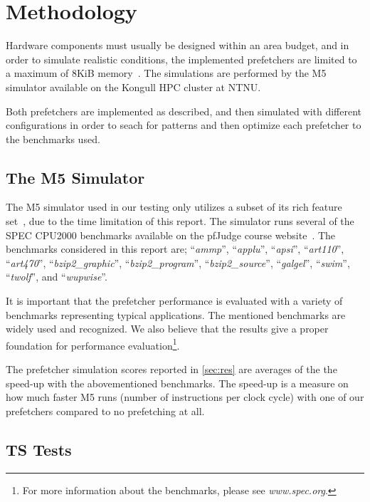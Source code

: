 \section{Methodology}

Hardware components must usually be designed within an area budget, and in order
to simulate realistic conditions, the implemented prefetchers are limited to a
maximum of 8KiB memory~\cite{guidelines}. The simulations are performed by the
M5 simulator available on the Kongull HPC cluster at NTNU.

Both prefetchers are implemented as described, and then simulated with different
configurations in order to seach for patterns and then optimize each prefetcher
to the benchmarks used.

\subsection{The M5 Simulator}
The M5 simulator used in our testing only utilizes a subset of its rich
feature set~\cite{user_doc}, due to the time limitation of this report. The simulator runs several of the SPEC CPU2000 benchmarks available on the
pfJudge course website~\cite{guidelines}. The benchmarks considered in this
report are; ``\emph{ammp}'', ``\emph{applu}'', ``\emph{apsi}'',
``\emph{art110}'', ``\emph{art470}'', ``\emph{bzip2\_graphic}'',
``\emph{bzip2\_program}'', ``\emph{bzip2\_source}'', ``\emph{galgel}'',
``\emph{swim}'', ``\emph{twolf}'', and ``\emph{wupwise}''.

It is important that the prefetcher performance is evaluated with a variety of
benchmarks representing typical applications. The mentioned benchmarks are
widely used and recognized. We also believe that the results give a proper
foundation for performance evaluation\footnote{For more information about the
benchmarks, please see \emph{www.spec.org}.}.

The prefetcher simulation scores reported in \ref{sec:res} are averages of the
the speed-up with the abovementioned benchmarks. The speed-up is a measure on how
much faster M5 runs (number of instructions per clock cycle) with one of our
prefetchers compared to no prefetching at all.


\subsection{TS Tests}


